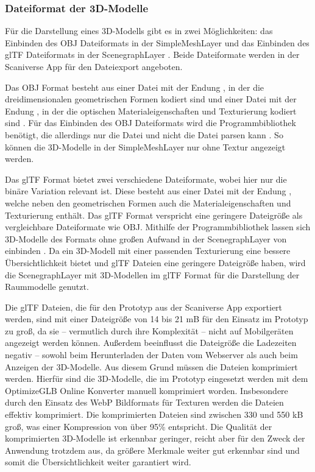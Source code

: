 \subsubsection{Dateiformat der 3D-Modelle}\label{sec:ModelFileFormat}
Für die Darstellung eines 3D-Modells gibt es in \deckgl{} zwei Möglichkeiten: das Einbinden des \ac{OBJ} Dateiformats in der SimpleMeshLayer \cite{DeckglSimpleMeshLayer} und das Einbinden des \ac{glTF} Dateiformats in der ScenegraphLayer \cite{DeckglScenegraphLayer}. Beide Dateiformate werden in der Scaniverse App für den Dateiexport angeboten.

Das \ac{OBJ} Format besteht aus einer Datei mit der Endung \obj{}, in der die dreidimensionalen geometrischen Formen kodiert sind \cite{OBJSpec} und einer Datei mit der Endung \mtl{}, in der die optischen Materialeigenschaften und Texturierung kodiert sind \cite{MTLSpec}. Für das Einbinden des \ac{OBJ} Dateiformats wird die \loadersgl{} Programmbibliothek benötigt, die allerdings nur die \obj{} Datei und nicht die \mtl{} Datei parsen kann \cite{OBJLoader}. So können die 3D-Modelle in der SimpleMeshLayer nur ohne Textur angezeigt werden.

Das \ac{glTF} Format bietet zwei verschiedene Dateiformate, wobei hier nur die binäre Variation relevant ist. Diese besteht aus einer Datei mit der Endung \glb{}, welche neben den geometrischen Formen auch die Materialeigenschaften und Texturierung enthält. Das \ac{glTF} Format verspricht eine geringere Dateigröße als vergleichbare Dateiformate wie \ac{OBJ}.\cite[Abschnitt 2]{glTFSpec} Mithilfe der \loadersgl{} Programmbibliothek lassen sich 3D-Modelle des Formats ohne großen Aufwand in der ScenegraphLayer von \deckgl{} einbinden \cite{DeckglScenegraphLayer}. Da ein 3D-Modell mit einer passenden Texturierung eine bessere Übersichtlichkeit bietet und \ac{glTF} Dateien eine geringere Dateigröße haben, wird die ScenegraphLayer mit 3D-Modellen im \ac{glTF} Format für die Darstellung der Raummodelle genutzt.

Die \ac{glTF} Dateien, die für den Prototyp aus der Scaniverse App exportiert werden, sind mit einer Dateigröße von 14 bis 21 \ac{mB} für den Einsatz im Prototyp zu groß, da sie – vermutlich durch ihre Komplexität – nicht auf Mobilgeräten angezeigt werden können. Außerdem beeinflusst die Dateigröße die Ladezeiten negativ – sowohl beim Herunterladen der Daten vom Webserver als auch beim Anzeigen der 3D-Modelle. Aus diesem Grund müssen die Dateien komprimiert werden. Hierfür sind die 3D-Modelle, die im Prototyp eingesetzt werden mit dem OptimizeGLB Online Konverter \cite{OptimizeGLB} manuell komprimiert worden. Insbesondere durch den Einsatz des \ac{WebP} Bildformats für Texturen werden die Dateien effektiv komprimiert. Die komprimierten Dateien sind zwischen 330 und 550 \ac{kB} groß, was einer Kompression von über 95\% entspricht. Die Qualität der komprimierten 3D-Modelle ist erkennbar geringer, reicht aber für den Zweck der Anwendung trotzdem aus, da größere Merkmale weiter gut erkennbar sind und somit die Übersichtlichkeit weiter garantiert wird.

